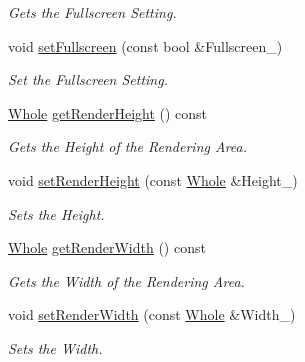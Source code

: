 \begin{DoxyCompactItemize}
\begin{DoxyCompactList}\small\item\em Gets the Fullscreen Setting. \item\end{DoxyCompactList}\item 
void \hyperlink{classphys_1_1GraphicsSettings_aba9e127ab2cf3f20604313e39d32f7a8}{setFullscreen} (const bool \&Fullscreen\_\-)
\begin{DoxyCompactList}\small\item\em Set the Fullscreen Setting. \item\end{DoxyCompactList}\item 
\hyperlink{namespacephys_a460f6bc24c8dd347b05e0366ae34f34a}{Whole} \hyperlink{classphys_1_1GraphicsSettings_a118171db4fc0a2b17da4284cc91fbeb4}{getRenderHeight} () const 
\begin{DoxyCompactList}\small\item\em Gets the Height of the Rendering Area. \item\end{DoxyCompactList}\item 
void \hyperlink{classphys_1_1GraphicsSettings_a1e6b11740f681beb4d64553656a760f1}{setRenderHeight} (const \hyperlink{namespacephys_a460f6bc24c8dd347b05e0366ae34f34a}{Whole} \&Height\_\-)
\begin{DoxyCompactList}\small\item\em Sets the Height. \item\end{DoxyCompactList}\item 
\hyperlink{namespacephys_a460f6bc24c8dd347b05e0366ae34f34a}{Whole} \hyperlink{classphys_1_1GraphicsSettings_aa8a8548afca8d3e127a1be69a2c1eba2}{getRenderWidth} () const 
\begin{DoxyCompactList}\small\item\em Gets the Width of the Rendering Area. \item\end{DoxyCompactList}\item 
void \hyperlink{classphys_1_1GraphicsSettings_a7cebb39f829f5e600231b4efc22b9ec3}{setRenderWidth} (const \hyperlink{namespacephys_a460f6bc24c8dd347b05e0366ae34f34a}{Whole} \&Width\_\-)
\begin{DoxyCompactList}\small\item\em Sets the Width. \item\end{DoxyCompactList}\end{DoxyCompactItemize}



